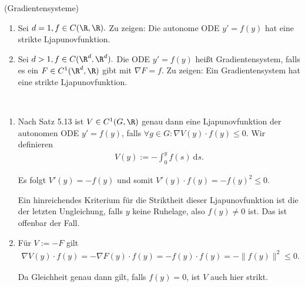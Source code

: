 \begin{exercise} (Gradientensysteme)
\begin{enumerate}[label = \textbf{\alph*)}]
  \item Sei $d = 1, f \in C(\R, \R).$ Zu zeigen: Die autonome ODE $y' = f(y)$ hat eine strikte Ljapunovfunktion.
  \item Sei $d > 1, f \in C(\R^d, \R^d).$ Die ODE $y' = f(y)$ heißt Gradientensystem, falls es ein $F \in C^1(\R^d, \R)$ gibt mit $\nabla F = f$. Zu zeigen: Ein Gradientensystem hat eine strikte Ljapunovfunktion.
\end{enumerate}
\end{exercise}

\begin{solution}
\leavevmode \\
\begin{enumerate}[label = \textbf{\alph*)}]
  \item Nach Satz 5.13 ist $V \in C^1(G, \R)$ genau dann eine Ljapunovfunktion der autonomen ODE $y' = f(y)$, falls $\forall g \in G: \nabla V(y) \cdot f(y) \leq 0$. Wir definieren
  \begin{align}
      V(y) := -\int_0^y f(s)~ \mathrm{d}s.
  \end{align}

  Es folgt $V'(y) = -f(y)$ und somit $V'(y) \cdot f(y) = -f(y)^2 \leq 0.$

  Ein hinreichendes Kriterium für die Striktheit dieser Ljapunovfunktion ist die der letzten Ungleichung, falls $y$ keine Ruhelage, also $f(y) \neq 0$ ist. Das ist offenbar der Fall.
  \item Für $V := -F$ gilt
  \begin{align}
      \nabla V(y) \cdot f(y) = - \nabla F(y) \cdot f(y) = - f(y) \cdot f(y) = - \| f(y) \|^2 \leq 0.
  \end{align}

  Da Gleichheit genau dann gilt, falls $f(y) = 0$, ist $V$ auch hier strikt.
\end{enumerate}
\end{solution}
